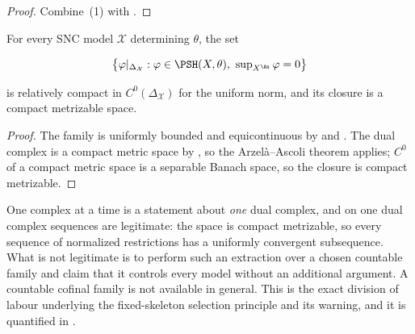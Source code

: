 \begin{proof}
Combine \,(1) with
.
\end{proof}

\begin{corollary}
\label{cor:ch22-arzela-ascoli}
For every SNC model $\mathcal X$ determining $\theta$, the set

\[
 \bigl\{\varphi|_{\Delta_{\mathcal X}}:
        \varphi\in\PSH(X,\theta),\ \sup\nolimits_{X^{\An}}\varphi=0\bigr\}
\]

is relatively compact in $C^0(\Delta_{\mathcal X})$ for the uniform norm,
and its closure is a compact metrizable space.
\end{corollary}

\begin{proof}
The family is uniformly bounded and equicontinuous by
 and
.  The dual complex is a compact metric
space by , so the Arzel\`a--Ascoli theorem
applies; $C^0$ of a compact metric space is a separable Banach space, so
the closure is compact metrizable.
\end{proof}

\begin{warning}{One complex at a time}
 is a statement about \emph{one} dual complex,
and on one dual complex sequences are legitimate: the space is compact
metrizable, so every sequence of normalized restrictions has a uniformly
convergent subsequence.  What is not legitimate is to perform such an
extraction over a chosen countable family and claim that it controls every
model without an additional argument.  A countable cofinal family is not
available in general.  This is the exact division of labour
underlying the fixed-skeleton selection principle
 and its warning, and it is
quantified in .
\end{warning}


